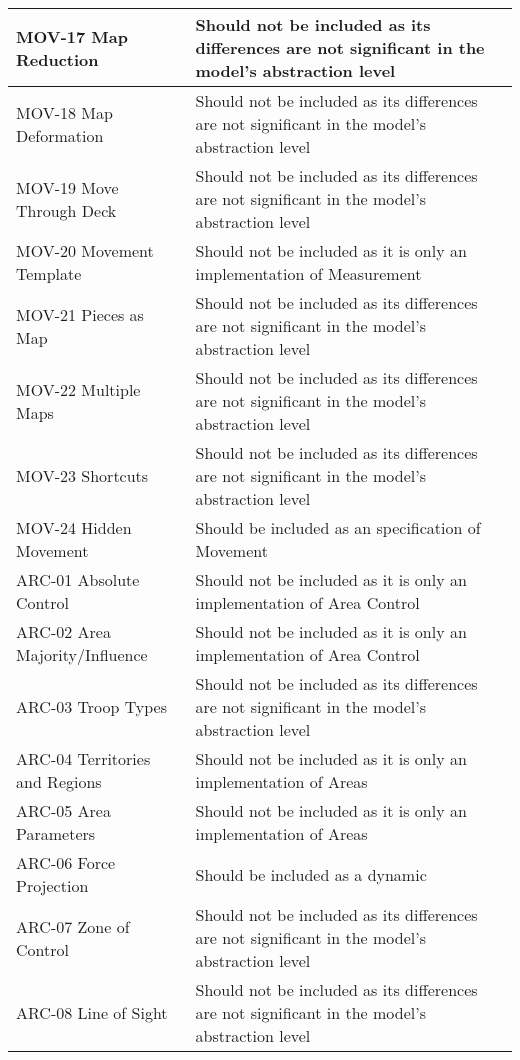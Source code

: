 \begin{longtable}{|m{7cm}|m{7cm}|}
        \hline
        MOV-17 Map Reduction & Should not be included as its differences are not significant in the model's abstraction level \\
        \hline
        MOV-18 Map Deformation & Should not be included as its differences are not significant in the model's abstraction level\\
        \hline
        MOV-19 Move Through Deck & Should not be included as its differences are not significant in the model's abstraction level \\
        \hline
        MOV-20 Movement Template & Should not be included as it is only an implementation of Measurement \\
        \hline
        MOV-21 Pieces as Map & Should not be included as its differences are not significant in the model's abstraction level \\
        \hline
        MOV-22 Multiple Maps & Should not be included as its differences are not significant in the model's abstraction level \\
        \hline
        MOV-23 Shortcuts & Should not be included as its differences are not significant in the model's abstraction level \\
        \hline
        MOV-24 Hidden Movement & Should be included as an specification of Movement \\
        \hline
        ARC-01 Absolute Control & Should not be included as it is only an implementation of Area Control \\
        \hline
        ARC-02 Area Majority/Influence & Should not be included as it is only an implementation of Area Control \\
        \hline
        ARC-03 Troop Types & Should not be included as its differences are not significant in the model's abstraction level \\
        \hline
        ARC-04 Territories and Regions & Should not be included as it is only an implementation of Areas\\
        \hline
        ARC-05 Area Parameters & Should not be included as it is only an implementation of Areas\\
        \hline
        ARC-06 Force Projection & Should be included as a dynamic \\
        \hline
        ARC-07 Zone of Control & Should not be included as its differences are not significant in the model's abstraction level\\
        \hline
        ARC-08 Line of Sight & Should not be included as its differences are not significant in the model's abstraction level \\

\end{longtable}
